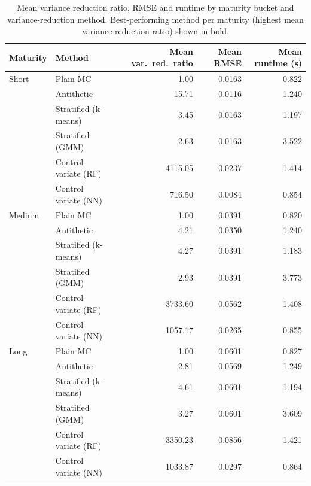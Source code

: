 \begin{table}[ht]
\centering
\caption{Mean variance reduction ratio, RMSE and runtime by maturity bucket and variance-reduction method. Best-performing method per maturity (highest mean variance reduction ratio) shown in bold.}
\label{tab:by_maturity}
\begin{tabular}{llrrr}
\toprule
Maturity & Method & Mean var.\ red.\ ratio & Mean RMSE & Mean runtime (s) \\
\midrule
Short & Plain MC & 1.00 & 0.0163 & 0.822 \\
 & Antithetic & 15.71 & 0.0116 & 1.240 \\
 & Stratified (k-means) & 3.45 & 0.0163 & 1.197 \\
 & Stratified (GMM) & 2.63 & 0.0163 & 3.522 \\
 & Control variate (RF) & 4115.05 & 0.0237 & 1.414 \\
 & Control variate (NN) & 716.50 & 0.0084 & 0.854 \\
\addlinespace
Medium & Plain MC & 1.00 & 0.0391 & 0.820 \\
 & Antithetic & 4.21 & 0.0350 & 1.240 \\
 & Stratified (k-means) & 4.27 & 0.0391 & 1.183 \\
 & Stratified (GMM) & 2.93 & 0.0391 & 3.773 \\
 & Control variate (RF) & 3733.60 & 0.0562 & 1.408 \\
 & Control variate (NN) & 1057.17 & 0.0265 & 0.855 \\
\addlinespace
Long & Plain MC & 1.00 & 0.0601 & 0.827 \\
 & Antithetic & 2.81 & 0.0569 & 1.249 \\
 & Stratified (k-means) & 4.61 & 0.0601 & 1.194 \\
 & Stratified (GMM) & 3.27 & 0.0601 & 3.609 \\
 & Control variate (RF) & 3350.23 & 0.0856 & 1.421 \\
 & Control variate (NN) & 1033.87 & 0.0297 & 0.864 \\
\bottomrule
\end{tabular}
\end{table}
